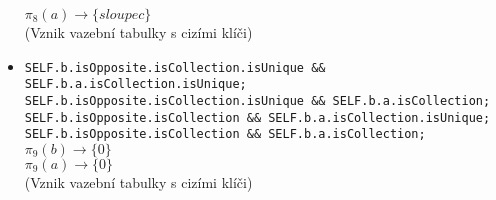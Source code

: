 \documentclass[11pt,a4paper]{article}
\begin{document}
\begin{itemize}
         							$\pi_8(a) \to \{ sloupec\}$	\\	
         							(Vznik vazební tabulky s cizími klíči)	 
         		     \item \texttt	{SELF.b.isOpposite.isCollection.isUnique \&\& SELF.b.a.isCollection.isUnique; \\
         							 SELF.b.isOpposite.isCollection.isUnique \&\& SELF.b.a.isCollection; \\
         							 SELF.b.isOpposite.isCollection \&\& SELF.b.a.isCollection.isUnique; \\
         							 SELF.b.isOpposite.isCollection \&\& SELF.b.a.isCollection; \\}       							
         							$\pi_9(b) \to \{ 0\}$ \\
         							$\pi_9(a) \to \{ 0\}$	\\	
         							(Vznik vazební tabulky s cizími klíči)	 				   							
   				\end{itemize}			   		    
\end{document}
